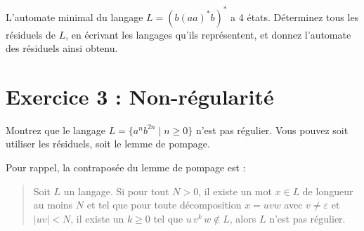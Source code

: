 \documentclass{fancy-article}
\begin{document}
  L'automate minimal du langage $L = (b(aa)^*b)^*$ a 4 états. Déterminez
  tous les résiduels de $L$, en écrivant les langages qu'ils
  représentent, et donnez l’automate des résiduels ainsi obtenu.

\vfill

\section*{Exercice 3 : Non-régularité}

  Montrez que le langage $L=\{ a^{n} b^{2n} \mid n \geq 0\}$ n'est pas régulier. Vous pouvez
  soit utiliser les résiduels, soit le lemme de pompage.


   \noindent Pour rappel, la contraposée du lemme de pompage est :
   \begin{quote}
    Soit $L$ un langage. 
   Si pour tout $N >0$, il existe un mot $x \in L$ de longueur au moins
   $N$ et tel que pour toute décomposition $x=uvw$ avec $v
   \neq\varepsilon$ et $|uv| <N$, il existe un $k \ge 0$ tel que $u\,
   v^k \, w \notin L$, alors $L$ n'est pas régulier.
   \end{quote}

\vfill
\end{document}
